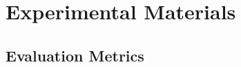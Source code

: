 \documentclass[10pt,conference]{IEEEtran}
\begin{document}
 
% 


\section{Experimental Materials}
\subsection{Evaluation Metrics}


\end{document}
